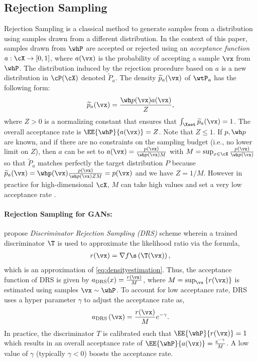 \documentclass[twoside]{article}
\begin{document}
\subsection{Rejection Sampling}\label{subsec: rejection sampling}
\label{subsec:rejsam}
Rejection Sampling is a classical method to generate samples from a distribution using samples drawn from a different distribution. In the context of this paper,  samples drawn from $\whP$ are accepted or rejected using an {\em acceptance function} $a: \cX\to [0,1]$, where $a(\vx)$ is the probability of accepting a sample $\vx$ from $\whP$. The distribution induced by the rejection procedure based on $a$ is a new distribution in $\cP(\cX)$ denoted $\widetilde{P}_a$. 
The density $\widetilde p_a(\vx)$ of $\wtP_a$ has the following form:
\begin{align}\label{eq:refineddensity}
    \widetilde p_a(\vx) = \frac{\wh p (\vx)a(\vx)}{Z},
\end{align} 
where $Z>0$ is a normalizing constant that ensures that $\int_{\Xset}\widetilde p_a(\vx)=1$. The overall acceptance rate is $\EE{\whP}{a(\vx)} =  Z$. Note that $Z\leq 1$.
If $p, \wh p$ are known, and if there are no constraints on the sampling budget (i.e., no lower limit on $Z$), then $a$ can be set to $a(\vx) = \frac{p (\vx)}{\wh p (\vx)M}$ with $M = \sup_{x\in \cX}\frac{p(\vx)}{\wh p(\vx)}$ so that $\widetilde{P}_a$ matches perfectly the target distribution $P$ because $\widetilde p_a(\vx) = \whp(\vx) \frac{p (\vx)}{\wh p (\vx)ZM} = p(\vx)$ and we have $Z=1/M$. 
However in practice for high-dimensional $\cX$, $M$ can take high values and set a very low acceptance rate \citep{mackay_information_2005}.




\paragraph{Rejection Sampling for GANs:}
\cite{azadi_discriminator_2019} propose \emph{Discriminator Rejection Sampling (DRS)} scheme wherein a trained discriminator $\T$ is used to approximate the likelihood ratio via the formula,
\begin{align}\label{eq:lkhratio}
    r(\vx) = \nabla f\s\left(\T(\vx)\right),
\end{align}
which is an approximation of \eqref{eq:densityestimation}.
Thus, the acceptance function of DRS is given by $a_{\mathrm{DRS}}(x)=\frac{r\left(\vx\right)}{M}$,
where $M=\sup_{\vx}  \left\{r(\vx)\right\}$ is estimated using samples $\vx\sim\whP$. To account for low acceptance rate, DRS uses a hyper parameter $\gamma$ to adjust the acceptance rate as,
\begin{align}
    a_{\mathrm{DRS}}\left(\vx\right)=\frac{r(\vx)}{M}e^{-\gamma}.
\end{align}
In practice, the discriminator $T$ is calibrated such that $\EE{\whP}{r(\vx)} =  1$ which results in an overall acceptance rate of $\EE{\whP}{a(\vx)} =  \frac{e^{-\gamma}}{M}$. A low value of $\gamma$ (typically $\gamma<0$) boosts the acceptance rate. 
\end{document}
